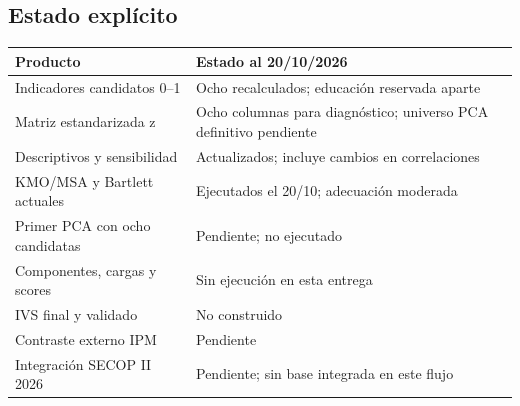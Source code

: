 \subsection{Estado explícito}

\begin{center}
\begin{tabularx}{\textwidth}{@{}p{}X@{}}
\toprule
\textbf{Producto} & \textbf{Estado al 20/10/2026}\\
\midrule
Indicadores candidatos 0--1 & Ocho recalculados; educación reservada aparte \\
Matriz estandarizada z & Ocho columnas para diagnóstico; universo PCA definitivo pendiente \\
Descriptivos y sensibilidad & Actualizados; incluye cambios en correlaciones \\
KMO/MSA y Bartlett actuales & Ejecutados el 20/10; adecuación moderada \\
Primer PCA con ocho candidatas & Pendiente; no ejecutado \\
Componentes, cargas y scores & Sin ejecución en esta entrega \\
IVS final y validado & No construido \\
Contraste externo IPM & Pendiente \\
Integración SECOP II 2026 & Pendiente; sin base integrada en este flujo \\
\bottomrule
\end{tabularx}
\end{center}
